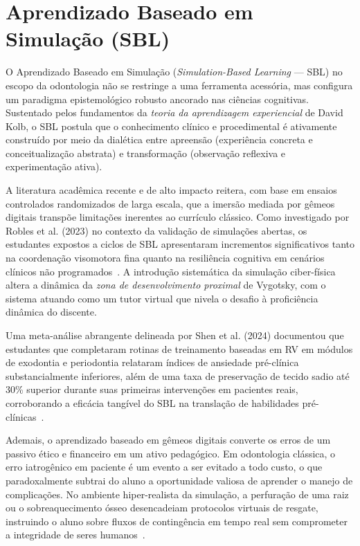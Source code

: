 \section{Aprendizado Baseado em Simulação (SBL)}
\label{sec:sbl}

O Aprendizado Baseado em Simulação (\textit{Simulation-Based Learning} — SBL) no escopo da odontologia não se restringe a uma ferramenta acessória, mas configura um paradigma epistemológico robusto ancorado nas ciências cognitivas. Sustentado pelos fundamentos da \textit{teoria da aprendizagem experiencial} de David Kolb, o SBL postula que o conhecimento clínico e procedimental é ativamente construído por meio da dialética entre apreensão (experiência concreta e conceitualização abstrata) e transformação (observação reflexiva e experimentação ativa). 

A literatura acadêmica recente e de alto impacto reitera, com base em ensaios controlados randomizados de larga escala, que a imersão mediada por gêmeos digitais transpõe limitações inerentes ao currículo clássico. Como investigado por Robles et al. (2023) no contexto da validação de simulações abertas, os estudantes expostos a ciclos de SBL apresentaram incrementos significativos tanto na coordenação visomotora fina quanto na resiliência cognitiva em cenários clínicos não programados~\cite{robles2023opentwins}. A introdução sistemática da simulação ciber-física altera a dinâmica da \textit{zona de desenvolvimento proximal} de Vygotsky, com o sistema atuando como um tutor virtual que nivela o desafio à proficiência dinâmica do discente.


Uma meta-análise abrangente delineada por Shen et al. (2024) documentou que estudantes que completaram rotinas de treinamento baseadas em RV em módulos de exodontia e periodontia relataram índices de ansiedade pré-clínica substancialmente inferiores, além de uma taxa de preservação de tecido sadio até 30\% superior durante suas primeiras intervenções em pacientes reais, corroborando a eficácia tangível do SBL na translação de habilidades pré-clínicas~\cite{shen2024effectiveness}.

Ademais, o aprendizado baseado em gêmeos digitais converte os erros de um passivo ético e financeiro em um ativo pedagógico. Em odontologia clássica, o erro iatrogênico em paciente é um evento a ser evitado a todo custo, o que paradoxalmente subtrai do aluno a oportunidade valiosa de aprender o manejo de complicações. No ambiente hiper-realista da simulação, a perfuração de uma raiz ou o sobreaquecimento ósseo desencadeiam protocolos virtuais de resgate, instruindo o aluno sobre fluxos de contingência em tempo real sem comprometer a integridade de seres humanos~\cite{bdj2026predictive}.
